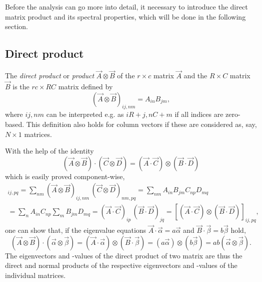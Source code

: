 Before the analysis can go more into detail, it necessary to introduce the
direct matrix product and its spectral properties, which will be done in the
following section.

\subsection{Direct product}

The \emph{direct product} or \emph{ product} $\vec A \otimes
\vec B$ of the $r \times c$ matrix $\vec A$ and the $R \times C$ matrix $\vec B$
is the $r c \times R C$ matrix defined by
%
\begin{equation*}
    (\vec A \otimes \vec B)_{i j, n m} = A_{i n} B_{j m},
\end{equation*}
%
where $i j, n m$ can be interpreted e.g. as $i R + j, n C + m$ if all indices
are zero-based. This definition also holds for column vectors if these are
considered as, say, $N \times 1$ matrices.

With the help of the identity
%
\begin{equation*}
    (\vec A \otimes \vec B) \cdot (\vec C \otimes \vec D)
    = (\vec A \cdot \vec C) \otimes (\vec B \cdot \vec D)
\end{equation*}
%
which is easily proved component-wise,
%
\begin{multline*}
    [(\vec A \otimes \vec B) \cdot (\vec C \otimes \vec D)]_{i j, p q}
    = \sum_{n m}
        (\vec A \otimes \vec B)_{i j, n m} \,
        (\vec C \otimes \vec D)_{n m, p q}
    = \sum_{n m} A_{i n} B_{j m} C_{n p} D_{m q}
    \\
    = \sum_n A_{i n} C_{n p} \sum_m B_{j m} D_{m q}
    = (\vec A \cdot \vec C)_{i p} \, (\vec B \cdot \vec D)_{j q}
    = [(\vec A \cdot \vec C) \otimes (\vec B \cdot \vec D)]_{i j, p q},
\end{multline*}
%
one can show that, if the eigenvalue equations $\vec A \cdot \vec \alpha = a
\vec \alpha$ and $\vec B \cdot \vec \beta = b \vec \beta$ hold,
%
\begin{equation} \label{eigenvalues direct product}
    (\vec A \otimes \vec B) \cdot (\vec \alpha \otimes \vec \beta)
    = (\vec A \cdot \vec \alpha) \otimes (\vec B \cdot \vec \beta)
    = (a \vec \alpha) \otimes (b \vec \beta)
    = a b (\vec \alpha \otimes \vec \beta).
\end{equation}
%
The eigenvectors and -values of the direct product of two matrix are thus the
direct and normal products of the respective eigenvectors and -values of the
individual matrices.

